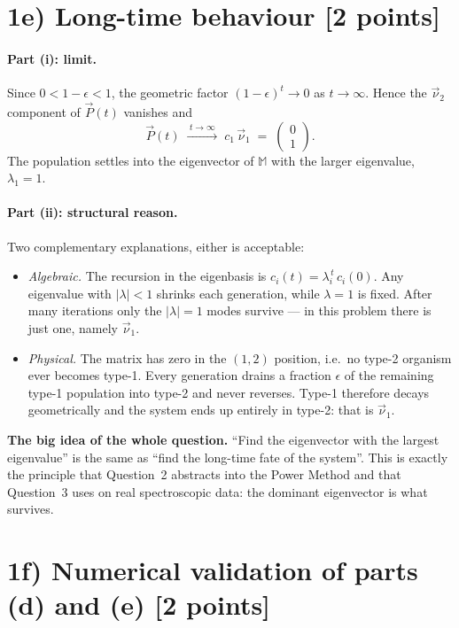 \documentclass[12pt,a4paper]{article}
\newcommand{\M}{\mathbb{M}}
\newcommand{\vnu}{\vec{\nu}}
\newcommand{\vP}{\vec{P}}
\begin{document}
\section*{1e) Long-time behaviour [2 points]}

\paragraph{Part (i): limit.} Since $0 < 1-\epsilon < 1$, the geometric factor $(1-\epsilon)^t \to 0$ as $t \to \infty$. Hence the $\vnu_2$ component of $\vP(t)$ vanishes and
\[
\vP(t) \;\xrightarrow{\;t\to\infty\;}\; c_1\,\vnu_1 \;=\; \begin{pmatrix} 0\\1\end{pmatrix}.
\]
The population settles into the eigenvector of $\M$ with the larger eigenvalue, $\lambda_1 = 1$.

\paragraph{Part (ii): structural reason.} Two complementary explanations, either is acceptable:
\begin{itemize}[leftmargin=*]
\item \emph{Algebraic.} The recursion in the eigenbasis is $c_i(t) = \lambda_i^{\,t}\,c_i(0)$. Any eigenvalue with $|\lambda|<1$ shrinks each generation, while $\lambda = 1$ is fixed. After many iterations only the $|\lambda|=1$ modes survive --- in this problem there is just one, namely $\vnu_1$.
\item \emph{Physical.} The matrix has zero in the $(1,2)$ position, i.e.~no type-2 organism ever becomes type-1. Every generation drains a fraction $\epsilon$ of the remaining type-1 population into type-2 and never reverses. Type-1 therefore decays geometrically and the system ends up entirely in type-2: that is $\vnu_1$.
\end{itemize}

\begin{insight}
\textbf{The big idea of the whole question.} ``Find the eigenvector with the largest eigenvalue'' is the same as ``find the long-time fate of the system''. This is exactly the principle that Question~2 abstracts into the Power Method and that Question~3 uses on real spectroscopic data: the dominant eigenvector is what survives.
\end{insight}

\section*{1f) Numerical validation of parts (d) and (e) [2 points]}
\end{document}

